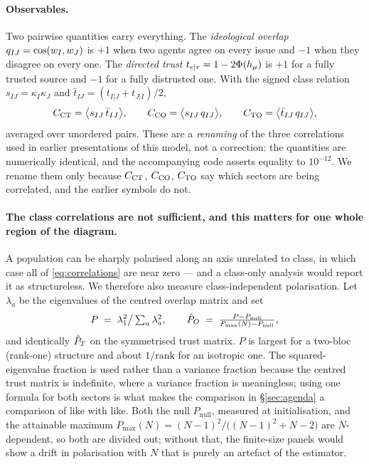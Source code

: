 \paragraph{Observables.}
Two pairwise quantities carry everything. The \emph{ideological overlap}
$q_{IJ}=\cos(w_I,w_J)$ is $+1$ when two agents agree on every issue and $-1$
when they disagree on every one. The \emph{directed trust}
$t_{e|r}=1-2\Phi(h_{\mu})$ is $+1$ for a fully trusted source and $-1$ for a fully
distrusted one. With the signed class relation $s_{IJ}=\kappa_I\kappa_J$ and
$\bar{t}_{IJ}=(t_{I|J}+t_{J|I})/2$,
%
\begin{equation}
  C_{\mathrm{CT}} = \bigl\langle s_{IJ}\,\bar{t}_{IJ} \bigr\rangle,
  \qquad
  C_{\mathrm{CO}} = \bigl\langle s_{IJ}\,q_{IJ} \bigr\rangle,
  \qquad
  C_{\mathrm{TO}} = \bigl\langle \bar{t}_{IJ}\,q_{IJ} \bigr\rangle,
  \label{eq:correlations}
\end{equation}
%
averaged over unordered pairs. These are a \emph{renaming} of the three
correlations used in earlier presentations of this model, not a correction: the
quantities are numerically identical, and the accompanying code asserts equality
to $10^{-12}$. We rename them only because $C_{\mathrm{CT}}$, $C_{\mathrm{CO}}$, $C_{\mathrm{TO}}$ say which
sectors are being correlated, and the earlier symbols do not.

\paragraph{The class correlations are not sufficient, and this matters for one
whole region of the diagram.}
A population can be sharply polarised along an axis unrelated to class, in which
case all of \eqref{eq:correlations} are near zero --- and a class-only analysis
would report it as structureless. We therefore also measure class-independent
polarisation. Let $\lambda_a$ be the eigenvalues of the centred overlap matrix
and set
%
\begin{equation}
  P \;=\; \lambda_1^{2}\big/\textstyle\sum_a \lambda_a^{2},
  \qquad
  \hat{P}_{O} \;=\; \frac{P-P_{\text{null}}}{P_{\max}(N)-P_{\text{null}}},
  \label{eq:polarisation}
\end{equation}
%
and identically $\hat{P}_{T}$ on the symmetrised trust matrix. $P$ is largest for a
two-bloc (rank-one) structure and about $1/\mathrm{rank}$ for an isotropic one.
The squared-eigenvalue fraction is used rather than a variance fraction because
the centred trust matrix is indefinite, where a variance fraction is
meaningless; using one formula for both sectors is what makes the comparison in
\S\ref{sec:agenda} a comparison of like with like. Both the null $P_{\text{null}}$,
measured at initialisation, and the attainable maximum
$P_{\max}(N)=(N-1)^2/\bigl((N-1)^2+N-2\bigr)$ are $N$-dependent, so both are
divided out; without that, the finite-size panels would show a drift in
polarisation with $N$ that is purely an artefact of the estimator.

